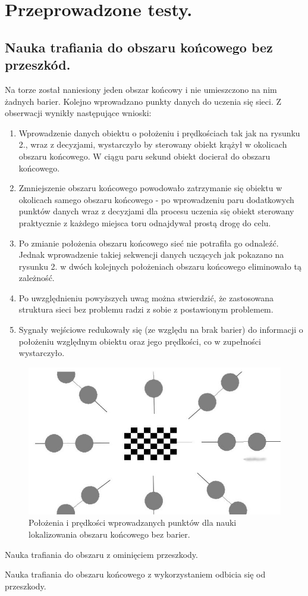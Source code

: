 \documentclass{article}
\begin{document}
\newpage

\section{Przeprowadzone testy.}
\subsection{Nauka trafiania do obszaru końcowego bez przeszkód.}

\indent Na torze został naniesiony jeden obszar końcowy i nie umieszczono na nim żadnych barier. Kolejno wprowadzano punkty danych do uczenia się sieci. Z obserwacji wynikły następujące wnioski:

\begin{enumerate}
		\item Wprowadzenie danych obiektu o położeniu i prędkościach tak jak na rysunku 2., wraz z decyzjami, wystarczyło by sterowany obiekt krążył w okolicach obszaru końcowego. W ciągu paru sekund obiekt docierał do obszaru końcowego.
			\item Zmniejszenie obszaru końcowego powodowało zatrzymanie się obiektu w okolicach samego obszaru końcowego - po wprowadzeniu paru dodatkowych punktów danych wraz z decyzjami dla procesu uczenia się obiekt  sterowany praktycznie z każdego miejsca toru odnajdywał prostą drogę do celu.
				\item Po zmianie położenia obszaru końcowego sieć nie potrafiła go odnaleźć. Jednak wprowadzenie takiej sekwencji  danych uczących jak pokazano na rysunku 2.  w dwóch kolejnych położeniach obszaru końcowego eliminowało tą zależność.
					\item Po uwzględnieniu powyższych uwag można stwierdzić, że zastosowana struktura sieci bez problemu radzi z sobie z postawionym problemem.
					\item Sygnały wejściowe redukowały się (ze względu na brak barier) do informacji o położeniu względnym obiektu oraz jego prędkości, co w zupełności wystarczyło.
\end{enumerate}

\begin{figure}
	\includegraphics[width=\textwidth]{rys2.jpg}
	\caption{Położenia i prędkości wprowadzanych punktów dla nauki lokalizowania obszaru końcowego bez barier.}
\end{figure}

\newpage

\indent Nauka trafiania do obszaru z ominięciem przeszkody.

\indent Nauka trafiania do obszaru końcowego z wykorzystaniem odbicia się od przeszkody.
\end{document}
